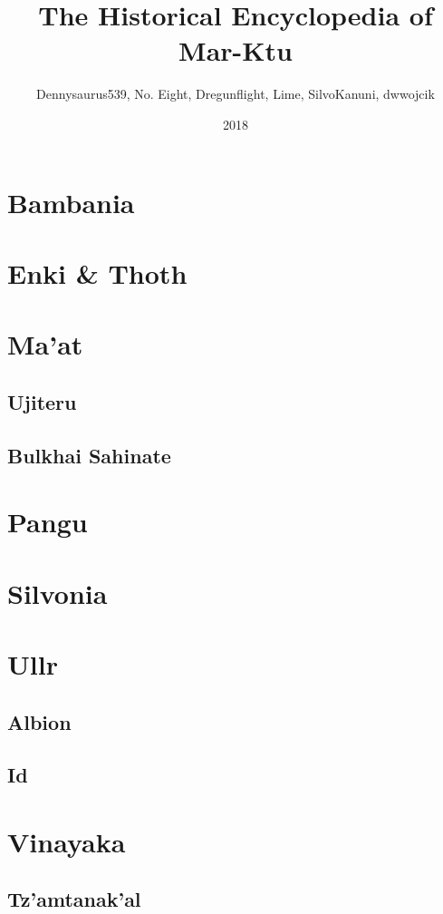 \documentclass[ansiapaper, 11pt, openright, twoside]{book}
\title{The Historical Encyclopedia of Mar-Ktu}
\date{2018}
\author{Dennysaurus539, No. Eight, Dregunflight, Lime, SilvoKanuni, dwwojcik}
\begin{document}
	
	
	\chapter{Bambania}
		\begin{multicols}{2}
			
		\end{multicols}
	\chapter{Enki \& Thoth}
		\begin{multicols}{2}
			
		\end{multicols}
	\chapter{Ma'at}
		\begin{multicols}{2}
			\section{Ujiteru}
				
			\section{Bulkhai Sahinate}
				
		\end{multicols}
	\chapter{Pangu}
		\begin{multicols}{2}
			
		\end{multicols}
	\chapter{Silvonia}
		\begin{multicols}{2}
			
		\end{multicols}
	\chapter{Ullr}
		\begin{multicols}{2}
			\section{Albion}
				
			\section{Id}
				
		\end{multicols}
	\chapter{Vinayaka} 
		\begin{multicols}{2}
			\section{Tz'amtanak'al}
				
		\end{multicols}
	\printindex
	
\end{document}
